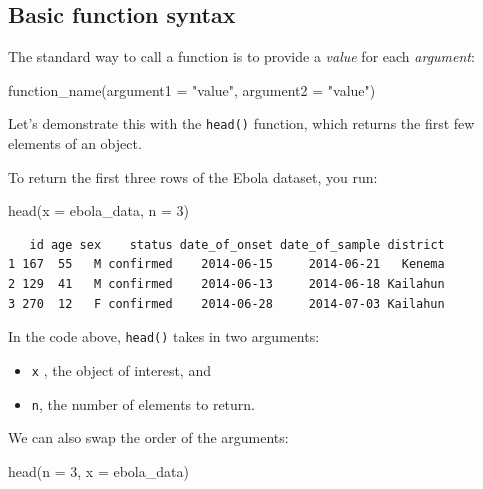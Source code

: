 \documentclass[
  letterpaper,
  DIV=11,
  numbers=noendperiod]{scrreprt}
\newenvironment{Shaded}{\begin{snugshade}}{\end{snugshade}}
\newcommand{\AttributeTok}[1]{\textcolor[rgb]{0.40,0.45,0.13}{#1}}
\newcommand{\DecValTok}[1]{\textcolor[rgb]{0.68,0.00,0.00}{#1}}
\newcommand{\FunctionTok}[1]{\textcolor[rgb]{0.28,0.35,0.67}{#1}}
\newcommand{\NormalTok}[1]{\textcolor[rgb]{0.00,0.23,0.31}{#1}}
\newcommand{\StringTok}[1]{\textcolor[rgb]{0.13,0.47,0.30}{#1}}
\begin{document}
\subsection{Basic function syntax}\label{basic-function-syntax}

The standard way to call a function is to provide a \emph{value} for
each \emph{argument}:

\begin{Shaded}
\begin{Highlighting}[]
\FunctionTok{function\_name}\NormalTok{(}\AttributeTok{argument1 =} \StringTok{"value"}\NormalTok{, }\AttributeTok{argument2 =} \StringTok{"value"}\NormalTok{)}
\end{Highlighting}
\end{Shaded}

Let's demonstrate this with the \texttt{head()} function, which returns
the first few elements of an object.

To return the first three rows of the Ebola dataset, you run:

\begin{Shaded}
\begin{Highlighting}[]
\FunctionTok{head}\NormalTok{(}\AttributeTok{x =}\NormalTok{ ebola\_data, }\AttributeTok{n =} \DecValTok{3}\NormalTok{)}
\end{Highlighting}
\end{Shaded}

\begin{verbatim}
   id age sex    status date_of_onset date_of_sample district
1 167  55   M confirmed    2014-06-15     2014-06-21   Kenema
2 129  41   M confirmed    2014-06-13     2014-06-18 Kailahun
3 270  12   F confirmed    2014-06-28     2014-07-03 Kailahun
\end{verbatim}

In the code above, \texttt{head()} takes in two arguments:

\begin{itemize}
\item
  \texttt{x} , the object of interest, and
\item
  \texttt{n}, the number of elements to return.
\end{itemize}

We can also swap the order of the arguments:

\begin{Shaded}
\begin{Highlighting}[]
\FunctionTok{head}\NormalTok{(}\AttributeTok{n =} \DecValTok{3}\NormalTok{, }\AttributeTok{x =}\NormalTok{ ebola\_data)}
\end{Highlighting}
\end{Shaded}
\end{document}
